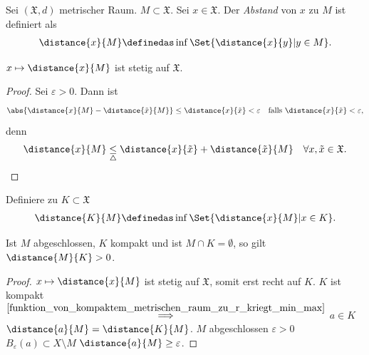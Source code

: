 \begin{beispiel*}
    Sei \( (\mathfrak{X},d)\) metrischer Raum. \( M\subset \mathfrak{X}\). Sei \( x\in \mathfrak{X}\). Der \emph{Abstand} von \( x\) zu \( M\) ist definiert als
    \begin{align*}
        \distance{x}{M}\definedas \inf\Set{\distance{x}{y}|y\in M}.
    \end{align*} 
    \begin{behauptung*}
        \( x\mapsto \distance{x}{M}\) ist stetig auf \( \mathfrak{X}\). 
    \end{behauptung*}
    \begin{proof}
        Sei \( \varepsilon>0\). Dann ist
        \begin{align*}
            \abs{\distance{x}{M}-\distance{\tilde{x}}{M}}\leq \distance{x}{\tilde{x}}<\varepsilon \quad \text{falls }\distance{x}{\tilde{x}}<\varepsilon, 
        \end{align*}
        denn
        \begin{align*}
            \distance{x}{M}\underset{\triangle}{\leq}\distance{x}{\tilde{x}}+\distance{\tilde{x}}{M}\quad \forall x,\tilde{x}\in \mathfrak{X}.
        \end{align*}
        
    \end{proof}
    Definiere zu \( K\subset \mathfrak{X} \)
    \begin{align*}
        \distance{K}{M}\definedas \inf\Set{\distance{x}{M}|x\in K}.
    \end{align*}
    \begin{behauptung*}
        Ist \( M \) abgeschlossen, \( K \) kompakt und ist \( M\cap K=\emptyset \), so gilt \( \distance{M}{K}>0 \).
    \end{behauptung*}
    \begin{proof}
        \( x\mapsto \distance{x}{M} \) ist stetig auf \( \mathfrak{X} \), somit erst recht auf \( K \). \( K \) ist kompakt \( \overset{\ref{funktion_von_kompaktem_metrischen_raum_zu_r_kriegt_min_max}}{\implies} \) \texists \( a\in K \) \sd \( \distance{a}{M}=\distance{K}{M} \). \( M \) abgeschlossen \timplies \texists \( \varepsilon>0 \) \sd \( B_{\varepsilon}(a)\subset X\setminus M \) \timplies \( \distance{a}{M}\geq \varepsilon \).
        

\end{proof}
\end{beispiel*}
